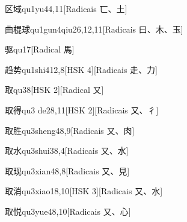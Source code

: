 \begin{entry}{区域}{qu1yu4}{4,11}[Radicais ⼖、⼟]
\end{entry}

\begin{entry}{曲棍球}{qu1gun4qiu2}{6,12,11}[Radicais ⽈、⽊、⽟]
\end{entry}

\begin{entry}{驱}{qu1}{7}[Radical ⾺]
\end{entry}

\begin{entry}{趋势}{qu1shi4}{12,8}[HSK 4][Radicais ⾛、⼒]
\end{entry}

\begin{entry}{取}{qu3}{8}[HSK 2][Radical ⼜]
\end{entry}

\begin{entry}{取得}{qu3 de2}{8,11}[HSK 2][Radicais ⼜、⼻]
\end{entry}

\begin{entry}{取胜}{qu3sheng4}{8,9}[Radicais ⼜、⾁]
\end{entry}

\begin{entry}{取水}{qu3shui3}{8,4}[Radicais ⼜、⽔]
\end{entry}

\begin{entry}{取现}{qu3xian4}{8,8}[Radicais ⼜、⾒]
\end{entry}

\begin{entry}{取消}{qu3xiao1}{8,10}[HSK 3][Radicais ⼜、⽔]
\end{entry}

\begin{entry}{取悦}{qu3yue4}{8,10}[Radicais ⼜、⼼]
\end{entry}

